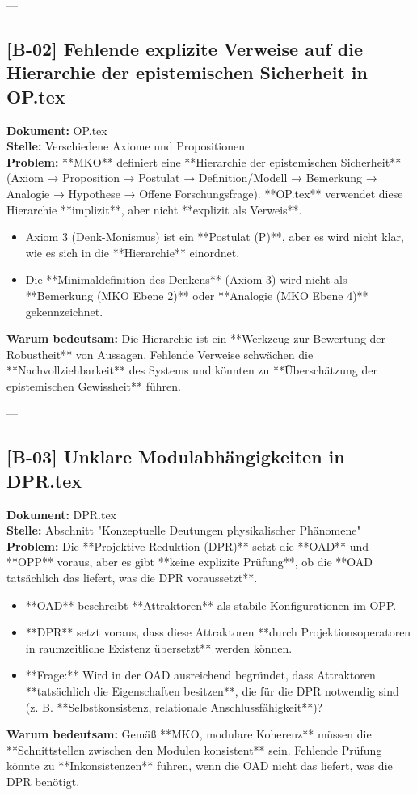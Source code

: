 \documentclass[11pt,a4paper]{article}
\begin{document}
---

\subsection*{[B-02] Fehlende explizite Verweise auf die Hierarchie der epistemischen Sicherheit in OP.tex}
\textbf{Dokument:} OP.tex \\
\textbf{Stelle:} Verschiedene Axiome und Propositionen \\
\textbf{Problem:}
**MKO** definiert eine **Hierarchie der epistemischen Sicherheit** (Axiom → Proposition → Postulat → Definition/Modell → Bemerkung → Analogie → Hypothese → Offene Forschungsfrage). **OP.tex** verwendet diese Hierarchie **implizit**, aber nicht **explizit als Verweis**.
\begin{itemize}
    \item Axiom 3 (Denk-Monismus) ist ein **Postulat (P)**, aber es wird nicht klar, wie es sich in die **Hierarchie** einordnet.
    \item Die **Minimaldefinition des Denkens** (Axiom 3) wird nicht als **Bemerkung (MKO Ebene 2)** oder **Analogie (MKO Ebene 4)** gekennzeichnet.
\end{itemize}
\textbf{Warum bedeutsam:}
Die Hierarchie ist ein **Werkzeug zur Bewertung der Robustheit** von Aussagen. Fehlende Verweise schwächen die **Nachvollziehbarkeit** des Systems und könnten zu **Überschätzung der epistemischen Gewissheit** führen.

---
\subsection*{[B-03] Unklare Modulabhängigkeiten in DPR.tex}
\textbf{Dokument:} DPR.tex \\
\textbf{Stelle:} Abschnitt "Konzeptuelle Deutungen physikalischer Phänomene" \\
\textbf{Problem:}
Die **Projektive Reduktion (DPR)** setzt die **OAD** und **OPP** voraus, aber es gibt **keine explizite Prüfung**, ob die **OAD tatsächlich das liefert, was die DPR voraussetzt**.
\begin{itemize}
    \item **OAD** beschreibt **Attraktoren** als stabile Konfigurationen im OPP.
    \item **DPR** setzt voraus, dass diese Attraktoren **durch Projektionsoperatoren in raumzeitliche Existenz übersetzt** werden können.
    \item **Frage:** Wird in der OAD ausreichend begründet, dass Attraktoren **tatsächlich die Eigenschaften besitzen**, die für die DPR notwendig sind (z. B. **Selbstkonsistenz, relationale Anschlussfähigkeit**)?
\end{itemize}
\textbf{Warum bedeutsam:}
Gemäß **MKO, modulare Koherenz** müssen die **Schnittstellen zwischen den Modulen konsistent** sein. Fehlende Prüfung könnte zu **Inkonsistenzen** führen, wenn die OAD nicht das liefert, was die DPR benötigt.
\end{document}
